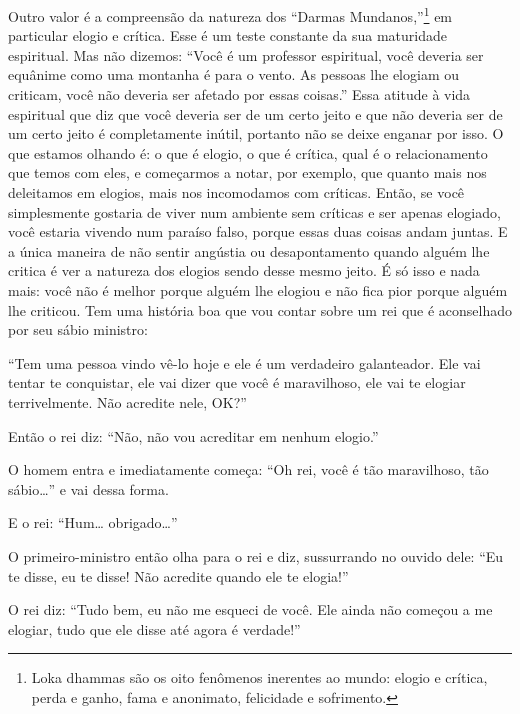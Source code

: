 Outro valor é a compreensão da natureza dos “Darmas
Mundanos,”\footnote{Loka dhammas são os oito fenômenos inerentes ao
mundo: elogio e crítica, perda e ganho, fama e anonimato, felicidade e
sofrimento.} em particular elogio e crítica. Esse é um teste constante
da sua maturidade espiritual. Mas não dizemos: “Você é um professor
espiritual, você deveria ser equânime como uma montanha é para o vento.
As pessoas lhe elogiam ou criticam, você não deveria ser afetado por
essas coisas.” Essa atitude à vida espiritual que diz que você deveria
ser de um certo jeito e que não deveria ser de um certo jeito é
completamente inútil, portanto não se deixe enganar por isso. O que
estamos olhando é: o que é elogio, o que é crítica, qual é o
relacionamento que temos com eles, e começarmos a notar, por exemplo,
que quanto mais nos deleitamos em elogios, mais nos incomodamos com
críticas. Então, se você simplesmente gostaria de viver num ambiente
sem críticas e ser apenas elogiado, você estaria vivendo num paraíso
falso, porque essas duas coisas andam juntas. E a única maneira de não
sentir angústia ou desapontamento quando alguém lhe critica é ver a
natureza dos elogios sendo desse mesmo jeito. É só isso e nada mais:
você não é melhor porque alguém lhe elogiou e não fica pior porque
alguém lhe criticou. Tem uma história boa que vou contar sobre um rei
que é aconselhado por seu sábio ministro: 

“Tem uma pessoa vindo vê-lo hoje e ele é um verdadeiro galanteador.
Ele vai tentar te conquistar, ele vai dizer que você é maravilhoso, ele
vai te elogiar terrivelmente. Não acredite nele, OK?” 

Então o rei diz: “Não, não vou acreditar em nenhum elogio.” 

O homem entra e imediatamente começa: “Oh rei, você é tão
maravilhoso, tão sábio\ldots{}” e vai dessa forma.

E o rei: “Hum\ldots{} obrigado\ldots{}”

O primeiro-ministro então olha para o rei e diz, sussurrando no
ouvido dele: “Eu te disse, eu te disse! Não acredite quando ele te
elogia!” 

O rei diz: “Tudo bem, eu não me esqueci de você. Ele ainda não
começou a me elogiar, tudo que ele disse até agora é verdade!” 

